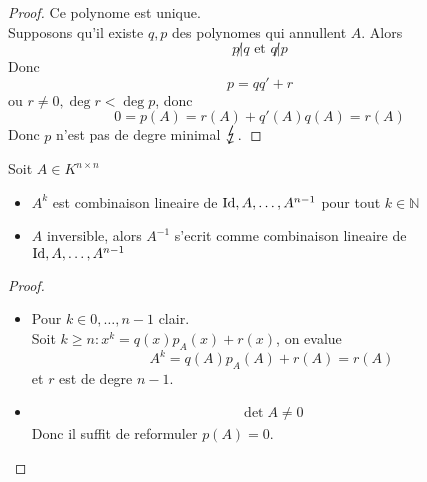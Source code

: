 \documentclass[../main.tex]{subfiles}
\begin{document}
\begin{proof}
Ce polynome est unique.\\
Supposons qu'il existe $q, p$ des polynomes qui annullent $A$.
Alors
\[ 
p \not | q \text{ et } q \not | p
\]
Donc
\[ 
p = q q' + r
\]
ou $r \neq 0, \deg r < \deg p$, donc
\[ 
	0 = p( A) = r( A)  + q'( A) q( A) = r( A) 
\]
Donc $p$ n'est pas de degre minimal $\contra.$
\end{proof}
\begin{crly}
Soit  $A \in K^{n\times n}$ 
\begin{itemize}
\item $A^{k}$ est combinaison lineaire de $\operatorname*{Id}, A, \ldots, A^{n-1}$ pour tout $k \in \mathbb{N}$

\item $A$ inversible, alors $A^{-1}$ s'ecrit comme combinaison lineaire de\\
	$\operatorname*{Id}, A, \ldots, A^{n-1}$
\end{itemize}

\end{crly}
\begin{proof}
\begin{itemize}
\item Pour $k \in 0, \ldots, n-1$ clair.\\
	Soit $k \geq n: x^{k}= q( x) p_A( x)  + r( x) $, on evalue
	\[ 
		A^{k} = q( A) p_A( A)  + r(A) = r( A) 	
	\]
	et $r$ est de degre $n-1$.

\item 
	\begin{align*}
		\det A \neq 0	
	\end{align*}
	Donc il suffit de reformuler $p( A) =0$.
	
	
\end{itemize}

\end{proof}
\end{document}
